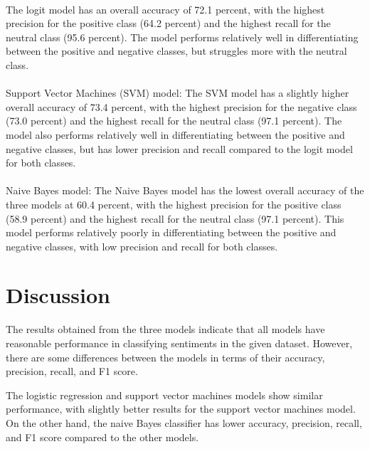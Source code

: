 \documentclass{article}
\begin{document}


\\
The logit model has an overall accuracy of 72.1 percent, with the highest precision for the positive class (64.2 percent) and the highest recall for the neutral class (95.6 percent). The model performs relatively well in differentiating between the positive and negative classes, but struggles more with the neutral class.
\\



\\
Support Vector Machines (SVM) model: The SVM model has a slightly higher overall accuracy of 73.4 percent, with the highest precision for the negative class (73.0 percent) and the highest recall for the neutral class (97.1 percent). The model also performs relatively well in differentiating between the positive and negative classes, but has lower precision and recall compared to the logit model for both classes.
\\



\\
Naive Bayes model: The Naive Bayes model has the lowest overall accuracy of the three models at 60.4 percent, with the highest precision for the positive class (58.9 percent) and the highest recall for the neutral class (97.1 percent). This model performs relatively poorly in differentiating between the positive and negative classes, with low precision and recall for both classes.



\section{Discussion}
The results obtained from the three models indicate that all models have reasonable performance in classifying sentiments in the given dataset. However, there are some differences between the models in terms of their accuracy, precision, recall, and F1 score.

The logistic regression and support vector machines models show similar performance, with slightly better results for the support vector machines model. On the other hand, the naive Bayes classifier has lower accuracy, precision, recall, and F1 score compared to the other models.
\end{document}
